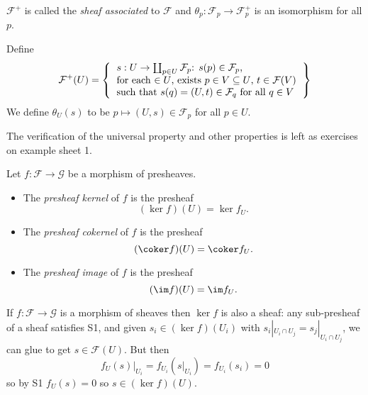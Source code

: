 \documentclass[a4paper]{article}
\newcommand{\sh}[1]{\mathcal{#1}} %
\begin{document}
\(\sh F^+\) is called the \emph{sheaf associated} to \(\sh F\) and \(\theta_p: \sh F_p \to \sh F_p^+\) is an isomorphism for all \(p\).

Define
\[
  \sh F^+(U) =
  \left\{
    \begin{tabular}{l}
      \(s: U \to \coprod_{p \in U} \sh F_p\): \(s(p) \in \sh F_p\), \\
      for each \(\in U\), exists \(p \in V \subseteq U\), \(t \in \sh F(V)\) \\
      such that \(s(q) = (U, t) \in \sh F_q\) for all \(q \in V\)
    \end{tabular}
  \right\}
\]
We define \(\theta_U(s)\) to be \(p \mapsto (U, s) \in \sh F_p\) for all \(p \in U\).

The verification of the universal property and other properties is left as exercises on example sheet 1.

\begin{definition}
  Let \(f: \sh F \to \sh G\) be a morphism of presheaves.
  \begin{itemize}
  \item The \emph{presheaf kernel} of \(f\) is the presheaf
    \[
      (\ker f)(U) = \ker f_U.
    \]
  \item The \emph{presheaf cokernel} of \(f\) is the presheaf
    \[
      (\coker f)(U) = \coker f_U.
    \]
  \item The \emph{presheaf image} of \(f\) is the presheaf
    \[
      (\im f)(U) = \im f_U.
    \]
  \end{itemize}
\end{definition}

\begin{remark}
  If \(f: \sh F \to \sh G\) is a morphism of sheaves then \(\ker f\) is also a sheaf: any sub-presheaf of a sheaf satisfies S1, and given \(s_i \in (\ker f)(U_i)\) with \(s_i|_{U_i \cap U_j} = s_j|_{U_i \cap U_j}\), we can glue to get \(s \in \sh F(U)\). But then
  \[
    f_U(s)|_{U_i} = f_{U_i}(s|_{U_i}) = f_{U_i}(s_i) = 0
  \]
  so by S1 \(f_U(s) = 0\) so \(s \in (\ker f)(U)\).
\end{remark}
\end{document}
